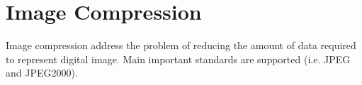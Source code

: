 \section{Image Compression}
Image compression address the problem of reducing the amount of data required to represent digital image. Main important standards are supported (i.e. JPEG and JPEG2000).
